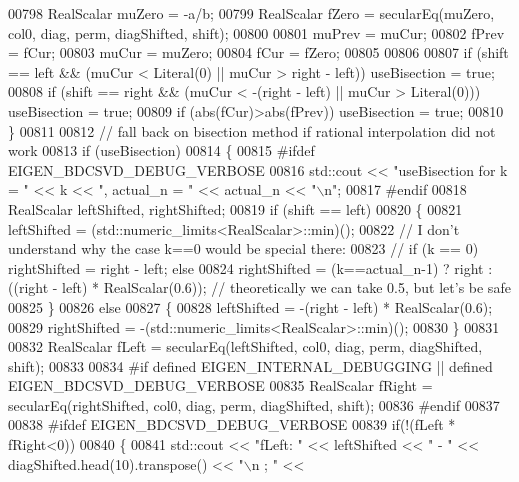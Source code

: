 \begin{DoxyCode}
00798       RealScalar muZero = -a/b;
00799       RealScalar fZero = secularEq(muZero, col0, diag, perm, diagShifted, shift);
00800       
00801       muPrev = muCur;
00802       fPrev = fCur;
00803       muCur = muZero;
00804       fCur = fZero;
00805       
00806       
00807       \textcolor{keywordflow}{if} (shift == left  && (muCur < Literal(0) || muCur > right - left)) useBisection = \textcolor{keyword}{true};
00808       \textcolor{keywordflow}{if} (shift == right && (muCur < -(right - left) || muCur > Literal(0))) useBisection = \textcolor{keyword}{true};
00809       \textcolor{keywordflow}{if} (abs(fCur)>abs(fPrev)) useBisection = \textcolor{keyword}{true};
00810     \}
00811 
00812     \textcolor{comment}{// fall back on bisection method if rational interpolation did not work}
00813     \textcolor{keywordflow}{if} (useBisection)
00814     \{
00815 \textcolor{preprocessor}{#ifdef  EIGEN\_BDCSVD\_DEBUG\_VERBOSE}
00816       std::cout << \textcolor{stringliteral}{"useBisection for k = "} << k << \textcolor{stringliteral}{", actual\_n = "} << actual\_n << \textcolor{stringliteral}{"\(\backslash\)n"};
00817 \textcolor{preprocessor}{#endif}
00818       RealScalar leftShifted, rightShifted;
00819       \textcolor{keywordflow}{if} (shift == left)
00820       \{
00821         leftShifted = (std::numeric\_limits<RealScalar>::min)();
00822         \textcolor{comment}{// I don't understand why the case k==0 would be special there:}
00823         \textcolor{comment}{// if (k == 0) rightShifted = right - left; else }
00824         rightShifted = (k==actual\_n-1) ? right : ((right - left) * RealScalar(0.6)); \textcolor{comment}{// theoretically we
       can take 0.5, but let's be safe}
00825       \}
00826       \textcolor{keywordflow}{else}
00827       \{
00828         leftShifted = -(right - left) * RealScalar(0.6);
00829         rightShifted = -(std::numeric\_limits<RealScalar>::min)();
00830       \}
00831       
00832       RealScalar fLeft = secularEq(leftShifted, col0, diag, perm, diagShifted, shift);
00833 
00834 \textcolor{preprocessor}{#if defined EIGEN\_INTERNAL\_DEBUGGING || defined EIGEN\_BDCSVD\_DEBUG\_VERBOSE}
00835       RealScalar fRight = secularEq(rightShifted, col0, diag, perm, diagShifted, shift);
00836 \textcolor{preprocessor}{#endif}
00837 
00838 \textcolor{preprocessor}{#ifdef  EIGEN\_BDCSVD\_DEBUG\_VERBOSE}
00839       \textcolor{keywordflow}{if}(!(fLeft * fRight<0))
00840       \{
00841         std::cout << \textcolor{stringliteral}{"fLeft: "} << leftShifted << \textcolor{stringliteral}{" - "} << diagShifted.head(10).transpose()  << \textcolor{stringliteral}{"\(\backslash\)n ; "} << 

\end{DoxyCode}

